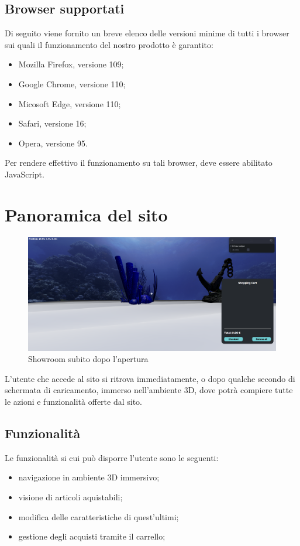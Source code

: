 \subsection{Browser supportati}
Di seguito viene fornito un breve elenco delle versioni minime di tutti i browser sui quali
il funzionamento del nostro prodotto è garantito:
\begin{itemize}
	\item Mozilla Firefox, versione 109;
	\item Google Chrome, versione 110;
	\item Micosoft Edge, versione 110;
	\item Safari, versione 16;
	\item Opera, versione 95.
\end{itemize}
Per rendere effettivo il funzionamento su tali browser, deve essere abilitato JavaScript.
\pagebreak



\section{Panoramica del sito}
\begin{figure}[H]
  \renewcommand{\thefigure}{1}
  \includegraphics[width=\linewidth]{./res/images/schermata_iniziale.png}
  \caption{Showroom subito dopo l'apertura}
  \label{Showroom subito dopo l'apertura}
\end{figure}
L'utente che accede al sito si ritrova immediatamente, o dopo qualche secondo di schermata di caricamento, immerso nell'ambiente 3D, dove potrà compiere tutte le azioni e funzionalità offerte dal sito. 
\subsection{Funzionalità}
Le funzionalità si cui può disporre l'utente sono le seguenti:
\begin{itemize}
\item navigazione in ambiente 3D immersivo;
\item visione di articoli aquistabili;
\item modifica delle caratteristiche di quest'ultimi;
\item gestione degli acquisti tramite il carrello;
\end{itemize}
\pagebreak


